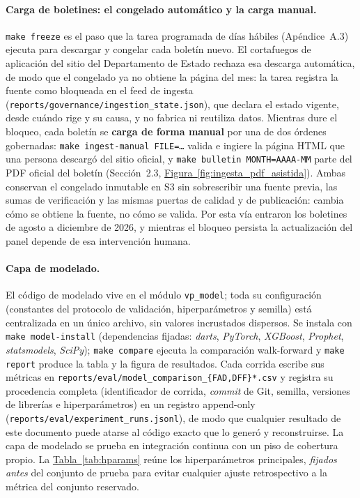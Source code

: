 \documentclass[12pt,letterpaper]{report}
\begin{document}
\paragraph{Carga de boletines: el congelado automático y la carga manual.} \texttt{make freeze} es
el paso que la tarea programada de días hábiles (Apéndice~A.3) ejecuta para descargar y congelar
cada boletín nuevo. El cortafuegos de aplicación del sitio del Departamento de Estado rechaza esa
descarga automática, de modo que el congelado ya no obtiene la página del mes: la tarea registra
la fuente como bloqueada en el feed de ingesta (\texttt{reports/governance/ingestion\_state.json}),
que declara el estado vigente, desde cuándo rige y su causa, y no fabrica ni reutiliza datos.
Mientras dure el bloqueo, cada boletín se \textbf{carga de forma manual} por una de dos órdenes gobernadas:
\texttt{make ingest-manual FILE=\ldots} valida e ingiere la página HTML que una persona
descargó del sitio oficial, y \texttt{make bulletin MONTH=AAAA-MM} parte del PDF oficial del
boletín (Sección~2.3, \hyperref[fig:ingesta_pdf_asistida]{Figura~\ref*{fig:ingesta_pdf_asistida}}). Ambas conservan el congelado
inmutable en S3 sin sobrescribir una fuente previa, las sumas de verificación y las mismas
puertas de calidad y de publicación: cambia cómo se obtiene la fuente, no cómo se valida. Por
esta vía entraron los boletines de agosto a diciembre de 2026, y mientras el bloqueo persista la
actualización del panel depende de esa intervención humana.


\paragraph{Capa de modelado.} El código de modelado vive en el módulo \texttt{vp\_model}; toda su
configuración (constantes del protocolo de validación, hiperparámetros y semilla) está
centralizada en un único archivo, sin valores incrustados dispersos. Se instala con
\texttt{make model-install} (dependencias fijadas: \textit{darts}, \textit{PyTorch},
\textit{XGBoost}, \textit{Prophet}, \textit{statsmodels}, \textit{SciPy}); \texttt{make compare}
ejecuta la comparación walk-forward y \texttt{make report} produce la tabla y la figura de
resultados. Cada corrida escribe sus métricas en
\texttt{reports/eval/model\_comparison\_\{FAD,DFF\}*.csv} y registra su procedencia completa
(identificador de corrida, \textit{commit} de Git, semilla, versiones de librerías e
hiperparámetros) en un registro append-only (\texttt{reports/eval/experiment\_runs.jsonl}), de
modo que cualquier resultado de este documento puede atarse al código exacto que lo generó y
reconstruirse. La capa de modelado se prueba en integración continua con un piso de cobertura
propio. La \hyperref[tab:hparams]{Tabla~\ref*{tab:hparams}} reúne los hiperparámetros principales, \textit{fijados antes}
del conjunto de prueba para evitar cualquier ajuste retrospectivo a la métrica del conjunto
reservado.
\end{document}
